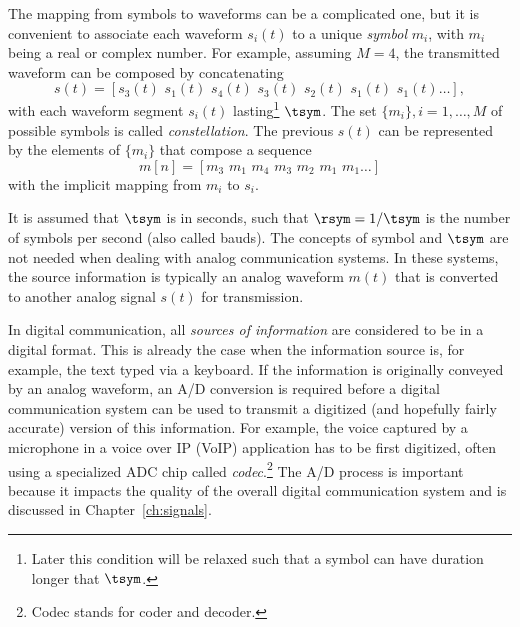 The mapping from symbols to waveforms can be a complicated one, but it is convenient to associate each waveform $s_i(t)$ to a unique \emph{symbol} $m_i$, with $m_i$ being a real or complex number. 
For example, assuming $M=4$, the transmitted waveform can be composed by concatenating 
\[
s(t) = [s_3(t)\textrm{~}s_1(t)\textrm{~}s_4(t)\textrm{~}s_3(t)\textrm{~}s_2(t)\textrm{~}s_1(t)\textrm{~}s_1(t) \ldots],
\]
with each waveform segment $s_i(t)$ lasting\footnote{Later this condition will be relaxed such that a symbol can have duration longer that $\tsym$.} $\tsym$.
The set $\{m_i\}, i=1,\ldots,M$ of possible symbols is called \emph{constellation}. The previous $s(t)$ can be represented by the elements of $\{m_i\}$ that compose a sequence
\begin{equation}
m[n] = [m_3\textrm{~}m_1\textrm{~}m_4\textrm{~}m_3\textrm{~}m_2\textrm{~}m_1\textrm{~}m_1 \ldots]
\label{eq:exampleOfSymbols}
\end{equation}
with the implicit mapping from $m_i$ to $s_i$.

It is assumed that $\tsym$ is in seconds, such that $\rsym = 1/\tsym$ is the number of symbols per second (also called bauds).
The concepts of symbol and $\tsym$ are not needed when dealing with analog communication systems. In these systems, the source information is typically an analog waveform $m(t)$ that is converted to another analog signal $s(t)$ for transmission.

In digital communication, all \emph{sources of information} are considered to be in a digital format. This is already the case when the information source is, for example, the text typed via a keyboard. If the information is originally conveyed by an analog waveform, an A/D conversion is required before a digital communication system can be used to transmit a digitized (and hopefully fairly accurate) version of this information. For example, the voice captured by a microphone in a voice over IP (VoIP) application has to be first digitized, often using a specialized ADC chip called \emph{codec}.\footnote{Codec stands for coder and decoder.} The A/D process is important because it impacts the quality of the overall digital communication system and is discussed in Chapter~\ref{ch:signals}.

